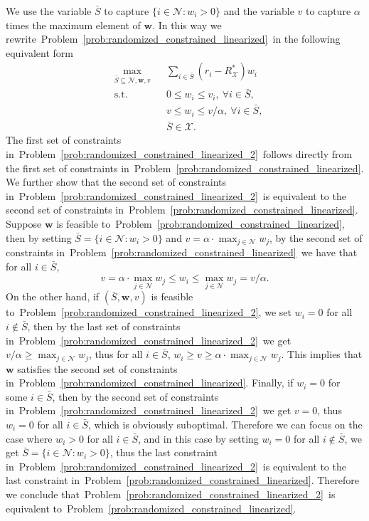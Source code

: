 \documentclass[mnsc,non-blindrev]{informs3}
\theoremstyle{definition}
\begin{document}
\begin{appendices}{\Large{}}
We use the variable $\bar{S}$ to capture $\{i\in\mathcal{N}:w_i>0\}$ and  the variable $v$ to capture $\alpha$ times the maximum element of $\bm{w}$. In this way we rewrite~Problem~\eqref{prob:randomized_constrained_linearized}~in the following equivalent form
\begin{equation}\label{prob:randomized_constrained_linearized_2}
\begin{aligned}
&\max_{\bar{S}\subseteq\mathcal{N},\bm{w},v}&&\sum_{i\in\bar{S}}(r_i-R_{\mathcal{X}}^*)w_i\\
&\text{s.t.}&&0\leq w_i\leq v_i,\ \forall i\in\bar{S},\\
&&&v\leq w_i\leq v/\alpha,\ \forall i\in\bar{S},\\
&&&\bar{S}\in\mathcal{X}.
\end{aligned}
\end{equation}
The first set of constraints in~Problem~\eqref{prob:randomized_constrained_linearized_2}~follows directly from the first set of constraints in~Problem~\eqref{prob:randomized_constrained_linearized}. We further show that the second set of constraints in~Problem~\eqref{prob:randomized_constrained_linearized_2}~is equivalent to the second set of constraints in~Problem~\eqref{prob:randomized_constrained_linearized}. Suppose $\bm{w}$ is feasible to~Problem~\eqref{prob:randomized_constrained_linearized}, then by setting $\bar{S}=\{i\in\mathcal{N}:w_i>0\}$ and $v=\alpha\cdot\max_{j\in\mathcal{N}}w_j$, by the second set of constraints in~Problem~\eqref{prob:randomized_constrained_linearized}~we have that for all $i\in\bar{S}$,
\begin{equation*}
v=\alpha\cdot\max_{j\in\mathcal{N}}w_j\leq w_i\leq \max_{j\in\mathcal{N}}w_j=v/\alpha.
\end{equation*}
On the other hand, if $(\bar{S},\bm{w},v)$ is feasible to~Problem~\eqref{prob:randomized_constrained_linearized_2}, we set $w_i=0$ for all $i\notin\bar{S}$, then by the last set of constraints in~Problem~\eqref{prob:randomized_constrained_linearized_2}~we get $v/\alpha\geq \max_{j\in\mathcal{N}}w_j$, thus for all $i\in\bar{S}$, $w_i\geq v\geq \alpha\cdot\max_{j\in\mathcal{N}}w_j$. This implies that $\bm{w}$ satisfies the second set of constraints in~Problem~\eqref{prob:randomized_constrained_linearized}. Finally, if $w_i=0$ for some $i\in\bar{S}$, then by the second set of constraints in~Problem~\eqref{prob:randomized_constrained_linearized_2}~we get $v=0$, thus $w_i=0$ for all $i\in\bar{S}$, which is obviously suboptimal. Therefore we can focus on the case where $w_i>0$ for all $i\in\bar{S}$, and in this case by setting $w_i=0$ for all $i\notin\bar{S}$, we get $\bar{S}=\{i\in\mathcal{N}:w_i>0\}$, thus the last constraint in~Problem~\eqref{prob:randomized_constrained_linearized_2}~is equivalent to the last constraint in~Problem~\eqref{prob:randomized_constrained_linearized}. Therefore we conclude that~Problem~\eqref{prob:randomized_constrained_linearized_2}~is equivalent to~Problem~\eqref{prob:randomized_constrained_linearized}.


\end{appendices}
\end{document}
